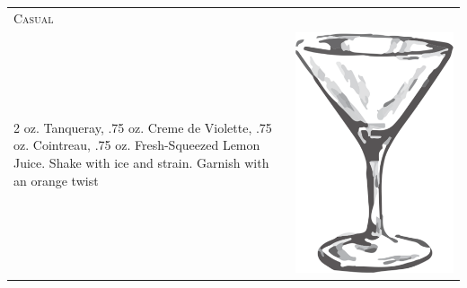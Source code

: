 \documentclass{article}
\begin{document}
\begin{tabular}{p{2in} p{0.5in}}
	\multicolumn{2}{p{3in}}{\centering\Huge\textsc{Casual}}\\ 
	  \vspace{-0.1in}2 oz. Tanqueray, .75 oz. Creme de Violette, .75 oz. Cointreau, .75 oz. Fresh-Squeezed Lemon Juice. Shake with ice and strain. Garnish with an orange twist &
	  \vspace{-0.1in} \includegraphics{goblet.png}
\end{tabular}\\
\end{document}

